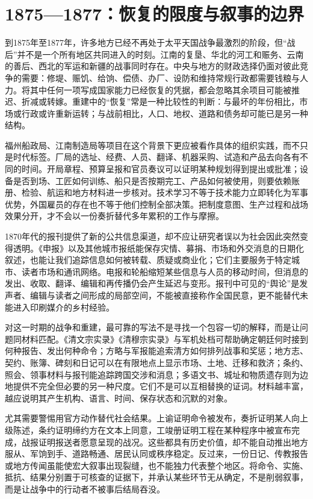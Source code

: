 \section{1875—1877：恢复的限度与叙事的边界}

到1875年至1877年，许多地方已经不再处于太平天国战争最激烈的阶段，但“战后”并不是一个所有地区共同进入的时刻。江南的复垦、华北的河工和赈务、云南的善后、西北的军运和新疆的战事同时存在。中央与地方的财政选择仍面对彼此竞争的需要：修堤、赈饥、给饷、偿债、办厂、设防和维持常规行政都需要钱粮与人力。将其中任何一项写成国家能力已经恢复的凭据，都会忽略其余项目可能被推迟、折减或转嫁。重建中的“恢复”常是一种比较性的判断：与最坏的年份相比，市场或行政或许重新运转；与战前相比，人口、地权、道路和债务却可能已是另一种结构。

福州船政局、江南制造局等项目在这个背景下更应被看作具体的组织实践，而不只是时代标签。厂局的选址、经费、人员、翻译、机器采购、试造和产品去向各有不同的时间。开局章程、预算呈报和官员奏议可以证明某种规划得到提出或批准；设备是否到场、工匠如何训练、船只是否按期完工、产品如何被使用，则要依赖账册、检验、航运和地方材料进一步核对。技术学习不等于技术能力立即转化为军事优势，外国雇员的存在也不等于他们控制全部决策。把制度意图、生产过程和战场效果分开，才不会以一份奏折替代多年累积的工作与摩擦。

1870年代的报刊提供了新的公共信息渠道，却不应让研究者误以为社会因此突然变得透明。《申报》以及其他城市报纸能保存灾情、募捐、市场和外交消息的日期化叙述，也能让我们追踪信息如何被转载、质疑或商业化；它们主要服务于特定城市、读者市场和通讯网络。电报和轮船缩短某些信息与人员的移动时间，但消息的发出、收取、翻译、编辑和再传播仍会产生延迟与变形。报刊中可见的“舆论”是发声者、编辑与读者之间形成的局部空间，不能被直接称作全国民意，更不能替代未能进入印刷媒介的乡村经验。

对这一时期的战争和重建，最可靠的写法不是寻找一个包容一切的解释，而是让问题同材料匹配。《清文宗实录》《清穆宗实录》与军机处档可帮助确定朝廷何时接到何种报告、发出何种命令；方略与军报能追索清方如何排列战事和奖惩；地方志、契约、账簿、碑刻和日记可以在有限地点上显示市场、土地、迁移和救济；条约、照会、领事材料与报刊能追踪跨国交涉和消息；多语文书、城址和物质遗存则为边地提供不完全但必要的另一种尺度。它们不是可以互相替换的证词。材料越丰富，越应说明其产生机构、语言、时间、保存状态和沉默的对象。

尤其需要警惕用官方动作替代社会结果。上谕证明命令被发布，奏折证明某人向上级陈述，条约证明缔约方在文本上同意，工竣册证明工程在某种程序中被宣布完成，战报证明报送者愿意呈现的战况。这些都具有历史价值，却不能自动推出地方服从、军饷到手、道路畅通、居民认同或秩序稳定。反过来，一份日记、传教报告或地方传闻虽能使宏大叙事出现裂缝，也不能独力代表整个地区。将命令、实施、抵抗、结果分别置于可核查的证据下，并承认某些环节无从确定，不是削弱叙事，而是让战争中的行动者不被事后结局吞没。

